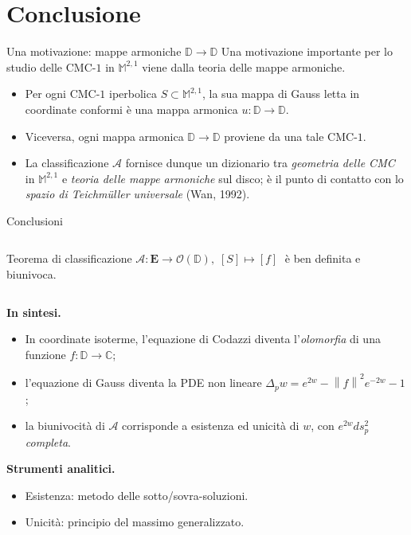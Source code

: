 \documentclass[aspectratio=169,11pt]{beamer}
\newcommand{\C}{\mathbb{C}}
\newcommand{\D}{\mathbb{D}}
\newcommand{\M}{\mathbb{M}^{2,1}}
\newcommand{\OD}{\mathcal{O}(\D)}
\newcommand{\EE}{\mathbf{E}}
\newcommand{\Amap}{\mathcal{A}}
\newcommand{\norm}[1]{\left\lVert #1 \right\rVert}
\begin{document}
\section{Conclusione}

\begin{frame}[t]{Una motivazione: mappe armoniche $\D\to\D$}
  Una motivazione importante per lo studio delle CMC-$1$ in $\M$ viene
  dalla \alert{teoria delle mappe armoniche}.

  \vspace{2mm}
  \begin{itemize}\itemsep=4pt
    \item Per ogni CMC-$1$ iperbolica $S\subset\M$, la sua mappa di
          Gauss letta in coordinate conformi è una \alert{mappa armonica}
          $u:\D\to\D$.
    \item Viceversa, ogni mappa armonica $\D\to\D$ proviene da una
          tale CMC-$1$.
    \item La classificazione $\Amap$ fornisce dunque un dizionario tra
          \emph{geometria delle CMC} in $\M$ e
          \emph{teoria delle mappe armoniche} sul disco;
          è il punto di contatto con lo \emph{spazio di Teichmüller
          universale} (Wan, 1992).
  \end{itemize}
\end{frame}


\begin{frame}[t]{Conclusioni}
  \begin{columns}[T,onlytextwidth]
    \hfill
    \begin{block}{Teorema di classificazione}
      \centering
      $\Amap:\EE\to\OD,\;[S]\mapsto[f]\;$
      è \alert{ben definita e biunivoca}.
    \end{block}
    \hfill
  \end{columns}

  \vspace{3mm}
  \textbf{In sintesi.}
  \begin{itemize}\itemsep=2pt
    \item In coordinate isoterme, l'equazione di Codazzi diventa
          l'\emph{olomorfia} di una funzione $f:\D\to\C$;
    \item l'equazione di Gauss diventa la PDE non lineare
          $\Delta_p w = e^{2w}-\norm{f}^2 e^{-2w}-1$;
    \item la biunivocità di $\Amap$ corrisponde a esistenza ed unicità
          di $w$, con $e^{2w}ds_p^2$ \emph{completa}.
  \end{itemize}

  \vspace{2mm}
  \textbf{Strumenti analitici.}
  \begin{itemize}\itemsep=2pt
    \item Esistenza: \alert{metodo delle sotto/sovra-soluzioni}.
    \item Unicità: \alert{principio del massimo generalizzato}.
  \end{itemize}
\end{frame}
\end{document}
